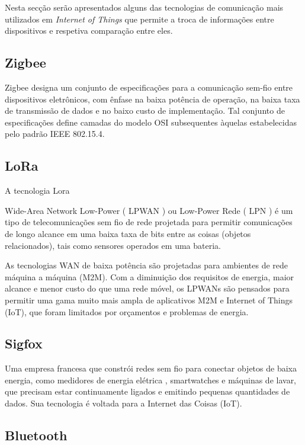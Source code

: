 Nesta secção serão apresentados alguns das tecnologias de comunicação mais utilizados em \textit{Internet of Things} que permite a troca de informações entre dispositivos e respetiva comparação entre eles. 




\subsection{Zigbee}

Zigbee designa um conjunto de especificações para a comunicação sem-fio entre dispositivos eletrônicos, com ênfase na baixa potência de operação, na baixa taxa de transmissão de dados e no baixo custo de implementação. Tal conjunto de especificações define camadas do modelo OSI subsequentes àquelas estabelecidas pelo padrão IEEE 802.15.4.


\subsection{LoRa}

A tecnologia Lora

Wide-Area Network Low-Power ( LPWAN ) ou Low-Power Rede ( LPN ) é um tipo de telecomunicações sem fio de rede projetada para permitir comunicações de longo alcance em uma baixa taxa de bits entre as coisas (objetos relacionados), tais como sensores operados em uma bateria.

As tecnologias WAN de baixa potência são projetadas para ambientes de rede máquina a máquina (M2M). Com a diminuição dos requisitos de energia, maior alcance e menor custo do que uma rede móvel, os LPWANs são pensados para permitir uma gama muito mais ampla de aplicativos M2M e Internet of Things (IoT), que foram limitados por orçamentos e problemas de energia.



\subsection{Sigfox}

Uma empresa francesa que constrói redes sem fio para conectar objetos de baixa energia, como medidores de energia elétrica , smartwatches e máquinas de lavar, que precisam estar continuamente ligados e emitindo pequenas quantidades de dados. Sua tecnologia é voltada para a Internet das Coisas (IoT).



\subsection{Bluetooth}

